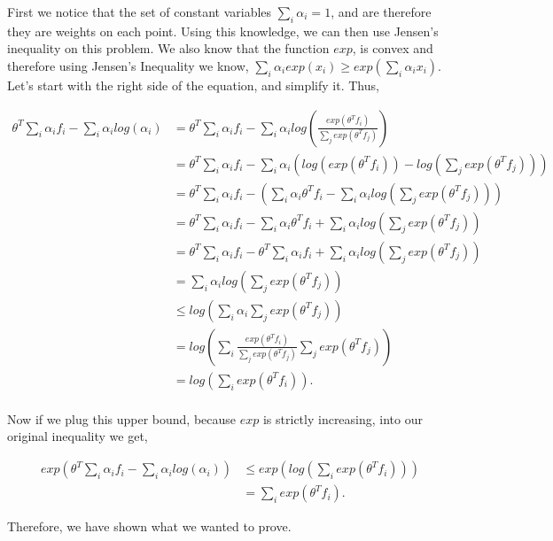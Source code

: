 \documentclass[paper=a4, fontsize=11pt]{scrartcl} %
\begin{document}
First we notice that the set of constant variables $\sum_i \alpha_i = 1$, and are therefore they are weights on each point.
Using this knowledge, we can then use Jensen's inequality on this problem.
We also know that the function $exp$, is convex and therefore using Jensen's Inequality we know, $\sum_i \alpha_i exp(x_i) \ge exp(\sum_i \alpha_i x_i)$.
Let's start with the right side of the equation, and simplify it.
Thus, 

\begin{align}
 \theta^T \sum_i \alpha_if_i - \sum_i \alpha_i log(\alpha_i) &=  \theta^T \sum_i \alpha_if_i - \sum_i \alpha_i log(\frac{exp(\theta^Tf_i)}{\sum_j exp(\theta^Tf_j)}) \\
&=  \theta^T \sum_i \alpha_if_i - \sum_i \alpha_i (log(exp(\theta^Tf_i)) - log(\sum_j exp(\theta^Tf_j))) \\
&= \theta^T \sum_i \alpha_if_i - (\sum_i \alpha_i \theta^T f_i -  \sum_i  \alpha_i  log(\sum_j exp(\theta^Tf_j))) \\
&=  \theta^T \sum_i \alpha_if_i - \sum_i \alpha_i \theta^T f_i + \sum_i  \alpha_i  log(\sum_j exp(\theta^Tf_j)) \\
&=  \theta^T \sum_i \alpha_if_i - \theta^T \sum_i \alpha_i f_i + \sum_i  \alpha_i  log(\sum_j exp(\theta^Tf_j)) \\
& =  \sum_i  \alpha_i  log(\sum_j exp(\theta^Tf_j)) \\
& \le  log( \sum_i \alpha_i \sum_j exp(\theta^T f_j)) \\
&= log( \sum_i \frac{exp(\theta^T f_i)}{\sum_j exp(\theta^Tf_j)}\sum_j exp(\theta^Tf_j)) \\
&= log(\sum_i exp(\theta^T f_i)). \\
\end{align}

Now if we plug this upper bound, because $exp$ is strictly increasing, into our original inequality we get, 

\begin{align}
 exp( \theta^T \sum_i \alpha_if_i - \sum_i \alpha_i log(\alpha_i)) &\le exp( log(\sum_i exp(\theta^T f_i))) \\
&= \sum_i exp(\theta^T f_i).
\end{align}

Therefore, we have shown what we wanted to prove.
\end{document}
